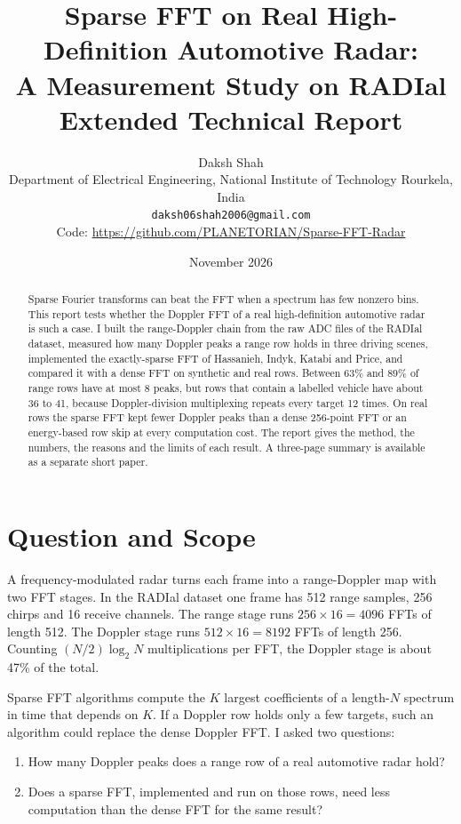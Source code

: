 \documentclass[10pt,a4paper]{article}
\title{Sparse FFT on Real High-Definition Automotive Radar:\\ A Measurement Study on RADIal\\[0.3em]\large Extended Technical Report}
\author{Daksh Shah\\
Department of Electrical Engineering, National Institute of Technology Rourkela, India\\
\texttt{daksh06shah2006@gmail.com}\\
Code: \url{https://github.com/PLANETORIAN/Sparse-FFT-Radar}}
\date{November 2026}
\begin{document}
\maketitle

\begin{abstract}
\noindent Sparse Fourier transforms can beat the FFT when a spectrum has few nonzero bins. This report tests whether the Doppler FFT of a real high-definition automotive radar is such a case. I built the range-Doppler chain from the raw ADC files of the RADIal dataset, measured how many Doppler peaks a range row holds in three driving scenes, implemented the exactly-sparse FFT of Hassanieh, Indyk, Katabi and Price, and compared it with a dense FFT on synthetic and real rows. Between 63\% and 89\% of range rows have at most 8 peaks, but rows that contain a labelled vehicle have about 36 to 41, because Doppler-division multiplexing repeats every target 12 times. On real rows the sparse FFT kept fewer Doppler peaks than a dense 256-point FFT or an energy-based row skip at every computation cost. The report gives the method, the numbers, the reasons and the limits of each result. A three-page summary is available as a separate short paper.
\end{abstract}

\tableofcontents
\bigskip

\section{Question and Scope}
A frequency-modulated radar turns each frame into a range-Doppler map with two FFT stages. In the RADIal dataset \cite{rebut2022radial} one frame has 512 range samples, 256 chirps and 16 receive channels. The range stage runs $256 \times 16 = 4096$ FFTs of length 512. The Doppler stage runs $512 \times 16 = 8192$ FFTs of length 256. Counting $(N/2)\log_2 N$ multiplications per FFT, the Doppler stage is about 47\% of the total.

Sparse FFT algorithms \cite{hassanieh2012nearly,hassanieh2012simple} compute the $K$ largest coefficients of a length-$N$ spectrum in time that depends on $K$. If a Doppler row holds only a few targets, such an algorithm could replace the dense Doppler FFT. I asked two questions:
\begin{enumerate}
\item How many Doppler peaks does a range row of a real automotive radar hold?
\item Does a sparse FFT, implemented and run on those rows, need less computation than the dense FFT for the same result?
\end{enumerate}
\end{document}
